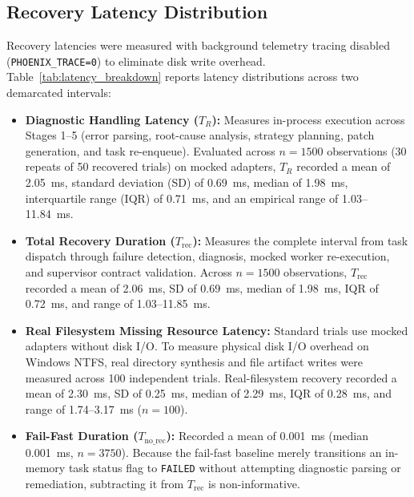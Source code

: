 \documentclass[conference]{IEEEtran}
\begin{document}
\subsection{Recovery Latency Distribution}
Recovery latencies were measured with background telemetry tracing disabled (\texttt{PHOENIX\_TRACE=0}) to eliminate disk write overhead. Table~\ref{tab:latency_breakdown} reports latency distributions across two demarcated intervals:
\begin{itemize}
    \item \textbf{Diagnostic Handling Latency ($T_R$):} Measures in-process execution across Stages 1--5 (error parsing, root-cause analysis, strategy planning, patch generation, and task re-enqueue). Evaluated across $n=1500$ observations (30 repeats of 50 recovered trials) on mocked adapters, $T_R$ recorded a mean of 2.05~ms, standard deviation (SD) of 0.69~ms, median of 1.98~ms, interquartile range (IQR) of 0.71~ms, and an empirical range of 1.03--11.84~ms.
    \item \textbf{Total Recovery Duration ($T_{\text{rec}}$):} Measures the complete interval from task dispatch through failure detection, diagnosis, mocked worker re-execution, and supervisor contract validation. Across $n=1500$ observations, $T_{\text{rec}}$ recorded a mean of 2.06~ms, SD of 0.69~ms, median of 1.98~ms, IQR of 0.72~ms, and range of 1.03--11.85~ms.
    \item \textbf{Real Filesystem Missing Resource Latency:} Standard trials use mocked adapters without disk I/O. To measure physical disk I/O overhead on Windows NTFS, real directory synthesis and file artifact writes were measured across 100 independent trials. Real-filesystem recovery recorded a mean of 2.30~ms, SD of 0.25~ms, median of 2.29~ms, IQR of 0.28~ms, and range of 1.74--3.17~ms ($n=100$).
    \item \textbf{Fail-Fast Duration ($T_{\text{no\_rec}}$):} Recorded a mean of 0.001~ms (median 0.001~ms, $n=3750$). Because the fail-fast baseline merely transitions an in-memory task status flag to \texttt{FAILED} without attempting diagnostic parsing or remediation, subtracting it from $T_{\text{rec}}$ is non-informative.
\end{itemize}
\end{document}
